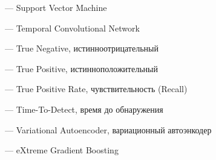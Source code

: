 \begin{description}[
    font=\normalfont\bfseries,
    leftmargin=0pt, labelindent=0pt, labelsep=0.4em,
    style=sameline, itemsep=2pt, topsep=0pt
]
    \item[SVM] {\normalfont --- Support Vector Machine}
    \item[TCN] {\normalfont --- Temporal Convolutional Network}
    \item[TN] {\normalfont --- True Negative, истинноотрицательный}
    \item[TP] {\normalfont --- True Positive, истинноположительный}
    \item[TPR] {\normalfont --- True Positive Rate, чувствительность (Recall)}
    \item[TTD] {\normalfont --- Time-To-Detect, время до обнаружения}
    \item[VAE] {\normalfont --- Variational Autoencoder, вариационный автоэнкодер}
    \item[XGBoost] {\normalfont --- eXtreme Gradient Boosting}
\end{description}
